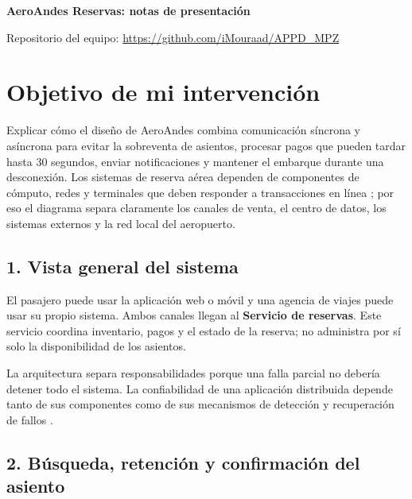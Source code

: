 \documentclass[11pt,a4paper]{article}
\begin{document}
\begin{center}
{\LARGE\textbf{AeroAndes Reservas: notas de presentación}\par}
\end{center}

\begin{center}
\small Repositorio del equipo: \url{https://github.com/iMouraad/APPD_MPZ}
\end{center}

\section*{Objetivo de mi intervención}

Explicar cómo el diseño de AeroAndes combina comunicación síncrona y asíncrona para evitar la sobreventa de asientos, procesar pagos que pueden tardar hasta 30 segundos, enviar notificaciones y mantener el embarque durante una desconexión. Los sistemas de reserva aérea dependen de componentes de cómputo, redes y terminales que deben responder a transacciones en línea \cite{airline-reservations}; por eso el diagrama separa claramente los canales de venta, el centro de datos, los sistemas externos y la red local del aeropuerto.

\subsection*{1. Vista general del sistema}

El pasajero puede usar la aplicación web o móvil y una agencia de viajes puede usar su propio sistema. Ambos canales llegan al \textbf{Servicio de reservas}. Este servicio coordina inventario, pagos y el estado de la reserva; no administra por sí solo la disponibilidad de los asientos.

La arquitectura separa responsabilidades porque una falla parcial no debería detener todo el sistema. La confiabilidad de una aplicación distribuida depende tanto de sus componentes como de sus mecanismos de detección y recuperación de fallos \cite{distributed-reliability}.

\subsection*{2. Búsqueda, retención y confirmación del asiento}
\end{document}
